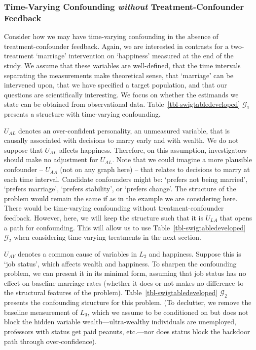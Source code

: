 \documentclass[
  single column]{article}
\begin{document}
\subsubsection{\texorpdfstring{Time-Varying Confounding \emph{without}
Treatment-Confounder
Feedback}{Time-Varying Confounding without Treatment-Confounder Feedback}}\label{time-varying-confounding-without-treatment-confounder-feedback}

Consider how we may have time-varying confounding in the absence of
treatment-confounder feedback. Again, we are interested in contrasts for
a two-treatment `marriage' intervention on `happiness' measured at the
end of the study. We assume that these variables are well-defined, that
the time intervals separating the measurements make theoretical sense,
that `marriage' can be intervened upon, that we have specified a target
population, and that our questions are scientifically interesting. We
focus on whether the estimands we state can be obtained from
observational data. Table~\ref{tbl-swigtabledeveloped} \(\mathcal{G}_1\)
presents a structure with time-varying confounding.

\(U_{AL}\) denotes an over-confident personality, an unmeasured
variable, that is causally associated with decisions to marry early and
with wealth. We do not suppose that \(U_{AL}\) affects happiness.
Therefore, on this assumption, investigators should make no adjustment
for \(U_{AL}\). Note that we could imagine a more plausible confounder
-- \(U_{AA}\) (not on any graph here) -- that relates to decisions to
marry at each time interval. Candidate confounders might be: `prefers
not being married', `prefers marriage', `prefers stability', or `prefers
change'. The structure of the problem would remain the same if as in the
example we are considering here. There would be time-varying confounding
without treatment-confounder feedback. However, here, we will keep the
structure such that it is \(U_{LA}\) that opens a path for confounding.
This will allow us to use Table~\ref{tbl-swigtabledeveloped}
\(\mathcal{G}_2\) when considering time-varying treatments in the next
section.

\(U_{AY}\) denotes a common cause of variables in \(L_2\) and happiness.
Suppose this is `job status', which affects wealth and happiness. To
sharpen the confounding problem, we can present it in its minimal form,
assuming that job status has no effect on baseline marriage rates
(whether it does or not makes no difference to the structural features
of the problem). Table~\ref{tbl-swigtabledeveloped} \(\mathcal{G}_2\)
presents the confounding structure for this problem. (To declutter, we
remove the baseline measurement of \(L_0\), which we assume to be
conditioned on but does not block the hidden variable
wealth---ultra-wealthy individuals are unemployed, professors with
status get paid peanuts, etc.---nor does status block the backdoor path
through over-confidence).
\end{document}
